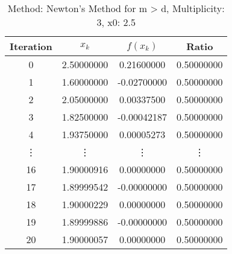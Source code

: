 \begin{table}
\centering
\caption{Method: Newton's Method for m > d, Multiplicity: 3, x0: 2.5}
\label{tab:table_Newton's_Method_for_m_>_d_3_2_5}
\begin{tabular}{c c c c}
\toprule
Iteration &      $x_k$ &    $f(x_k)$ &      Ratio \\
\midrule
        0 & 2.50000000 &  0.21600000 & 0.50000000 \\
        1 & 1.60000000 & -0.02700000 & 0.50000000 \\
        2 & 2.05000000 &  0.00337500 & 0.50000000 \\
        3 & 1.82500000 & -0.00042187 & 0.50000000 \\
        4 & 1.93750000 &  0.00005273 & 0.50000000 \\
   \vdots &     \vdots &      \vdots &     \vdots \\
       16 & 1.90000916 &  0.00000000 & 0.50000000 \\
       17 & 1.89999542 & -0.00000000 & 0.50000000 \\
       18 & 1.90000229 &  0.00000000 & 0.50000000 \\
       19 & 1.89999886 & -0.00000000 & 0.50000000 \\
       20 & 1.90000057 &  0.00000000 & 0.50000000 \\
\bottomrule
\end{tabular}
\end{table}

